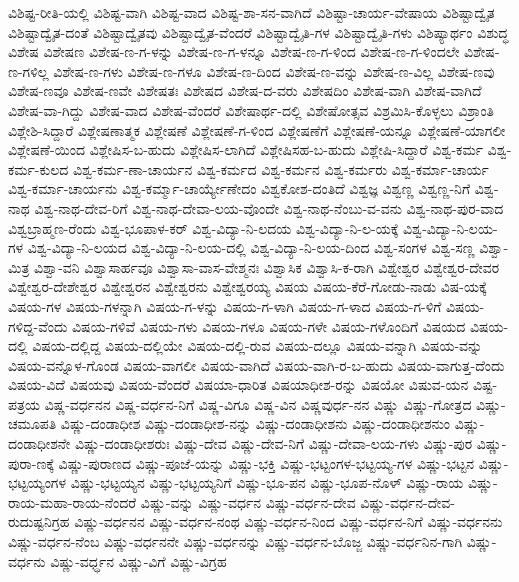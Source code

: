 ವಿಶಿಷ್ಟ-ರೀತಿ-ಯಲ್ಲಿ
ವಿಶಿಷ್ಟ-ವಾಗಿ
ವಿಶಿಷ್ಟ-ವಾದ
ವಿಶಿಷ್ಟ-ಶಾ-ಸನ-ವಾಗಿದೆ
ವಿಶಿಷ್ಟಾ-ಚಾರ್ಯ-ವೇಷಾಯ
ವಿಶಿಷ್ಟಾದ್ವೈತ
ವಿಶಿಷ್ಟಾದ್ವೈತ-ದಂತೆ
ವಿಶಿಷ್ಟಾದ್ವೈತವು
ವಿಶಿಷ್ಟಾದ್ವೈತ-ವೆಂದರೆ
ವಿಶಿಷ್ಟಾದ್ವೈತಿ-ಗಳ
ವಿಶಿಷ್ಟಾದ್ವೈತಿ-ಗಳು
ವಿಶಿಷ್ಯಾರ್ಥಂ
ವಿಶುದ್ಧ
ವಿಶೇಷ
ವಿಶೇಷಣ
ವಿಶೇಷ-ಣ-ಗ-ಳನ್ನು
ವಿಶೇಷ-ಣ-ಗ-ಳನ್ನೂ
ವಿಶೇಷ-ಣ-ಗ-ಳಿಂದ
ವಿಶೇಷ-ಣ-ಗ-ಳಿಂದಲೇ
ವಿಶೇಷ-ಣ-ಗಳಿಲ್ಲ
ವಿಶೇಷ-ಣ-ಗಳು
ವಿಶೇಷ-ಣ-ಗಳೂ
ವಿಶೇಷ-ಣ-ದಿಂದ
ವಿಶೇಷ-ಣ-ವನ್ನು
ವಿಶೇಷ-ಣ-ವಿಲ್ಲ
ವಿಶೇಷ-ಣವು
ವಿಶೇಷ-ಣವೂ
ವಿಶೇಷ-ಣವೇ
ವಿಶೇಷತಃ
ವಿಶೇಷದ
ವಿಶೇಷ-ದ-ವರು
ವಿಶೇಷದಿಂ
ವಿಶೇಷ-ವಾಗಿ
ವಿಶೇಷ-ವಾಗಿದೆ
ವಿಶೇಷ-ವಾ-ಗಿದ್ದು
ವಿಶೇಷ-ವಾದ
ವಿಶೇಷ-ವೆಂದರೆ
ವಿಶೇಷಾರ್ಥ-ದಲ್ಲಿ
ವಿಶೇಷೋತ್ಸವ
ವಿಶ್ರಮಿಸಿ-ಕೊಳ್ಳಲು
ವಿಶ್ರಾಂತಿ
ವಿಶ್ಲೇಶಿ-ಸಿದ್ದಾರೆ
ವಿಶ್ಲೇಷಣಾತ್ಮಕ
ವಿಶ್ಲೇಷಣೆ
ವಿಶ್ಲೇಷಣೆ-ಗ-ಳಿಂದ
ವಿಶ್ಲೇಷಣೆಗೆ
ವಿಶ್ಲೇಷಣೆ-ಯನ್ನೂ
ವಿಶ್ಲೇಷಣೆ-ಯಾಗಲೀ
ವಿಶ್ಲೇಷಣೆ-ಯಿಂದ
ವಿಶ್ಲೇಷಿಸ-ಬ-ಹುದು
ವಿಶ್ಲೇಷಿಸ-ಲಾಗಿದೆ
ವಿಶ್ಲೇಷಿಸಹ-ಬ-ಹುದು
ವಿಶ್ಲೇಷಿ-ಸಿದ್ದಾರೆ
ವಿಶ್ವ-ಕರ್ಮ
ವಿಶ್ವ-ಕರ್ಮ-ಕುಲದ
ವಿಶ್ವ-ಕರ್ಮ-ಣಾ-ಚಾರ್ಯನ
ವಿಶ್ವ-ಕರ್ಮದ
ವಿಶ್ವ-ಕರ್ಮನ
ವಿಶ್ವ-ಕರ್ಮರು
ವಿಶ್ವ-ಕರ್ಮಾ-ಚಾರ್ಯ
ವಿಶ್ವ-ಕರ್ಮಾ-ಚಾರ್ಯನು
ವಿಶ್ವ-ಕರ್ಮ್ಮಾ-ಚಾರ್ಯ್ಯೇಣೇದಂ
ವಿಶ್ವಕೋಶ-ದಂತಿದೆ
ವಿಶ್ವಜ್ಞ
ವಿಶ್ವಣ್ಣ
ವಿಶ್ವಣ್ಣ-ನಿಗೆ
ವಿಶ್ವ-ನಾಥ
ವಿಶ್ವ-ನಾಥ-ದೇವ-ರಿಗೆ
ವಿಶ್ವ-ನಾಥ-ದೇವಾ-ಲಯ-ವೊಂದೇ
ವಿಶ್ವ-ನಾಥ-ನೆಂಬು-ವ-ವನು
ವಿಶ್ವ-ನಾಥ-ಪುರ-ವಾದ
ವಿಶ್ವಬ್ರಾಹ್ಮಣ-ರೆಂದು
ವಿಶ್ವ-ಭೂಪಾಳ-ಕರ್
ವಿಶ್ವ-ವಿದ್ಯಾ-ನಿ-ಲದಯ
ವಿಶ್ವ-ವಿದ್ಯಾ-ನಿ-ಲ-ಯಕ್ಕೆ
ವಿಶ್ವ-ವಿದ್ಯಾ-ನಿ-ಲಯ-ಗಳ
ವಿಶ್ವ-ವಿದ್ಯಾ-ನಿ-ಲಯದ
ವಿಶ್ವ-ವಿದ್ಯಾ-ನಿ-ಲಯ-ದಲ್ಲಿ
ವಿಶ್ವ-ವಿದ್ಯಾ-ನಿ-ಲಯ-ದಿಂದ
ವಿಶ್ವ-ಸಂಗಳ
ವಿಶ್ವ-ಸಣ್ಣ
ವಿಶ್ವಾ-ಮಿತ್ರ
ವಿಶ್ವಾ-ವನಿ
ವಿಶ್ವಾಸಾರ್ಹವೂ
ವಿಶ್ವಾಸಾ-ವಾಸ-ವೇಶ್ಮನಃ
ವಿಶ್ವಾಸಿಕ
ವಿಶ್ವಾಸಿ-ಕ-ರಾಗಿ
ವಿಶ್ವೇಶ್ವರ
ವಿಶ್ವೇಶ್ವರ-ದೇವರ
ವಿಶ್ವೇಶ್ವರ-ದೇಶೇಶ್ವರ
ವಿಶ್ವೇಶ್ವರನ
ವಿಶ್ವೇಶ್ವರನು
ವಿಶ್ವೇಶ್ವರಯ್ಯ
ವಿಷಯ
ವಿಷಯ-ಕೆರೆ-ಗೋಡು-ನಾಡು
ವಿಷ-ಯಕ್ಕೆ
ವಿಷಯ-ಗಳ
ವಿಷಯ-ಗಳನ್ನಾಗಿ
ವಿಷಯ-ಗ-ಳನ್ನು
ವಿಷಯ-ಗ-ಳಾಗಿ
ವಿಷಯ-ಗ-ಳಾದ
ವಿಷಯ-ಗ-ಳಿಗೆ
ವಿಷಯ-ಗಳಿದ್ದ-ವೆಂದು
ವಿಷಯ-ಗಳಿವೆ
ವಿಷಯ-ಗಳು
ವಿಷಯ-ಗಳೂ
ವಿಷಯ-ಗಳೇ
ವಿಷಯ-ಗಳೊಂದಿಗೆ
ವಿಷಯದ
ವಿಷಯ-ದಲ್ಲಿ
ವಿಷಯ-ದಲ್ಲಿದ್ದ
ವಿಷಯ-ದಲ್ಲಿಯೇ
ವಿಷಯ-ದಲ್ಲಿ-ರುವ
ವಿಷಯ-ದಲ್ಲೂ
ವಿಷಯ-ವನ್ನಾಗಿ
ವಿಷಯ-ವನ್ನು
ವಿಷಯ-ವನ್ನೊಳ-ಗೊಂಡ
ವಿಷಯ-ವಾಗಲೀ
ವಿಷಯ-ವಾಗಿದೆ
ವಿಷಯ-ವಾಗಿ-ರ-ಬ-ಹುದು
ವಿಷಯ-ವಾಗುತ್ತ-ದೆಂದು
ವಿಷಯ-ವಿದೆ
ವಿಷಯವು
ವಿಷಯ-ವೆಂದರೆ
ವಿಷಯಾ-ಧಾರಿತ
ವಿಷಯಾಧೀಶ-ರನ್ನು
ವಿಷಯೋ
ವಿಷುವ-ಯನ
ವಿಷ್ಟ-ಪತ್ರಯ
ವಿಷ್ಣ-ವರ್ಧನನ
ವಿಷ್ಣ-ವರ್ಧನ-ನಿಗೆ
ವಿಷ್ಣ-ವಿಗೂ
ವಿಷ್ಣ-ವಿನ
ವಿಷ್ಣವುರ್ಧ-ನನ
ವಿಷ್ಣು
ವಿಷ್ಣು-ಗೋತ್ರದ
ವಿಷ್ಣು-ಚಮೂಪತಿ
ವಿಷ್ಣು-ದಂಡಾಧೀಶ
ವಿಷ್ಣು-ದಂಡಾಧೀಶ-ನನ್ನು
ವಿಷ್ಣು-ದಂಡಾಧೀಶನು
ವಿಷ್ಣು-ದಂಡಾಧೀಶನುಂ
ವಿಷ್ಣು-ದಂಡಾಧೀಶನೇ
ವಿಷ್ಣು-ದಂಡಾಧೀಶರುಃ
ವಿಷ್ಣು-ದೇವ
ವಿಷ್ಣು-ದೇವ-ನಿಗೆ
ವಿಷ್ಣು-ದೇವಾ-ಲಯ-ಗಳು
ವಿಷ್ಣು-ಪುರ
ವಿಷ್ಣು-ಪುರಾ-ಣಕ್ಕೆ
ವಿಷ್ಣು-ಪುರಾಣದ
ವಿಷ್ಣು-ಪೂಜೆ-ಯನ್ನು
ವಿಷ್ಣು-ಭಕ್ತಿ
ವಿಷ್ಣು-ಭಟ್ಟಂಗಳ-ಭಟ್ಟಯ್ಯ-ಗಳ
ವಿಷ್ಣು-ಭಟ್ಟನ
ವಿಷ್ಣು-ಭಟ್ಟಯ್ಯಂಗಳ
ವಿಷ್ಣು-ಭಟ್ಟಯ್ಯನ
ವಿಷ್ಣು-ಭಟ್ಟಯ್ಯನಿಗೆ
ವಿಷ್ಣು-ಭೂ-ಪನ
ವಿಷ್ಣು-ಭೂಪ-ನೊಳ್
ವಿಷ್ಣು-ರಾಯ
ವಿಷ್ಣು-ರಾಯ-ಮಹಾ-ರಾಯ-ನೆಂದರೆ
ವಿಷ್ಣು-ವನ್ನು
ವಿಷ್ಣು-ವರ್ಧನ
ವಿಷ್ಣು-ವರ್ಧನ-ದೇವ
ವಿಷ್ಣು-ವರ್ಧನ-ದೇವ-ರುದುಷ್ಟನಿಗ್ರಹ
ವಿಷ್ಣು-ವರ್ಧನನ
ವಿಷ್ಣು-ವರ್ಧನ-ನಂಥ
ವಿಷ್ಣು-ವರ್ಧನ-ನಿಂದ
ವಿಷ್ಣು-ವರ್ಧನ-ನಿಗೆ
ವಿಷ್ಣು-ವರ್ಧನನು
ವಿಷ್ಣು-ವರ್ಧನ-ನೆಂಬ
ವಿಷ್ಣು-ವರ್ಧನನೇ
ವಿಷ್ಣು-ವರ್ಧನನ್ನು
ವಿಷ್ಣು-ವರ್ಧನ-ಬೊಜ್ಜ
ವಿಷ್ಣು-ವರ್ಧನಿನ-ಗಾಗಿ
ವಿಷ್ಣು-ವರ್ಧನು
ವಿಷ್ಣು-ವರ್ಧ್ಧನ
ವಿಷ್ಣು-ವಿಗೆ
ವಿಷ್ಣು-ವಿಗ್ರಹ
